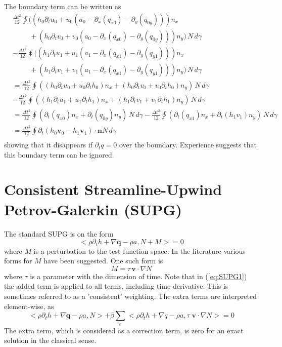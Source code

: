 \documentclass[10pt,a4paper]{book}
\newcommand{\p}{\partial}
\begin{document}
The boundary term can be written as
\begin{align*}
& \frac{\Delta t^2}{12} \oint (( h_0 \p_t u_0 + u_0 (a_0-\p_x (q_{x0})-\p_y (q_{0y}))) n_x \\
&  \hspace{1cm} +( h_0 \p_t v_0 + v_0 (a_0-\p_x (q_{x0})-\p_y (q_{0y}))) n_y )\, N \,d\gamma\\
&- \frac{\Delta t^2}{12} \oint (( h_1 \p_t u_1 + u_1 (a_1-\p_x (q_{x1})-\p_y (q_{y1}))) n_x \\
&  \hspace{1cm}  + ( h_1 \p_t v_1 + v_1 (a_1-\p_x (q_{x1})-\p_y (q_{y1}))) n_y )\, N \, d\gamma\\
&= \frac{\Delta t^2}{12} \oint (( h_0 \p_t u_0 + u_0 \p_t h_0) n_x +( h_0 \p_t v_0 + v_0 \p_t h_0) n_y )\, N \,d\gamma\\
&- \frac{\Delta t^2}{12} \oint (( h_1 \p_t u_1 + u_1 \p_t h_1) n_x + ( h_1 \p_t v_1 + v_1 \p_t h_1 ) n_y )\, N \, d\gamma\\
&= \frac{\Delta t^2}{12} \oint ( \p_t ( q_{x0} ) n_x + \p_t (q_{0y}) n_y )\, N \,d\gamma 
- \frac{\Delta t^2}{12} \oint ( \p_t ( q_{x1} ) n_x + \p_t ( h_1  v_1 ) n_y)\, N \, d\gamma\\
&= \frac{\Delta t^2}{12} \oint  \p_t (h_0 \bm{v}_0-h_1 \bm{v}_1)\cdot \bm{n} N \, d\gamma\\
\end{align*}
showing that it disappears if $\p_t q=0$ over the boundary.
Experience suggests that this boundary term can be ignored.


\section{Consistent Streamline-Upwind Petrov-Galerkin (SUPG)}

The  standard SUPG is on the form
\begin{equation}
< \rho \p_t h + \nabla \bm{q} -\rho a , N + M>=0
\label{eq:SUPG1}
\end{equation}
where $M$ is a perturbation to the test-function space. In the literature
various forms for $M$ have been suggested. One such form is
\[
M= \tau \, \bm{v} \cdot \nabla N 
\]
where $\tau$ is a parameter with the dimension of time. Note that in
(\ref{eq:SUPG1}) the added term is applied to all terms, including
time derivative. This is sometimes referred to as a 'consistent'
weighting. The extra terms are interpreted element-wise, as
\[
<\rho \p_t h + \nabla \bm{q}  -\rho a , N  >+ \beta \sum_e  <\rho \p_t h + \nabla{q} - \rho a , \tau \; \bm{v} \cdot \nabla N  >=0
\]
The extra term, which is considered as a correction term, is zero for
an exact solution in the classical sense. 
\end{document}
